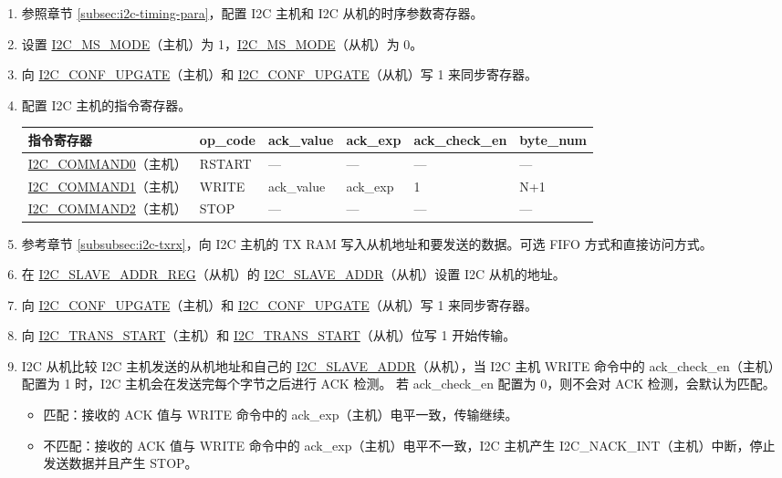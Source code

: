 \documentclass[main\_\_CN.tex]{subfiles}
\begin{document}
\begin{enumerate}
\item 参照章节 \ref{subsec:i2c-timing-para}，配置 I2C 主机和 I2C 从机的时序参数寄存器。
\item 设置 \hyperref[fielddesc:I2CMSMODE]{I2C\_MS\_MODE}（主机）为 1，\hyperref[fielddesc:I2CMSMODE]{I2C\_MS\_MODE}（从机）为 0。
\item 向 \hyperref[fielddesc:I2CCONFUPGATE]{I2C\_CONF\_UPGATE}（主机）和 \hyperref[fielddesc:I2CCONFUPGATE]{I2C\_CONF\_UPGATE}（从机）写 1 来同步寄存器。
\item 配置 I2C 主机的指令寄存器。

\begin{longtable}{ | p{4cm} | p{2cm} | p{2cm} | p{2cm} |p{2cm} | p{2cm} |}
\hline\rowcolor{lightgray}
指令寄存器& op\_code & ack\_value&ack\_exp&ack\_check\_en&byte\_num  \\ \hline
\hyperref[fielddesc:I2CCOMMAND0]{I2C\_COMMAND0}（主机）& RSTART& ---&---&---&---  \\ \hline
\hyperref[fielddesc:I2CCOMMAND1]{I2C\_COMMAND1}（主机）& WRITE& ack\_value&ack\_exp&1&N+1  \\ \hline
\hyperref[fielddesc:I2CCOMMAND2]{I2C\_COMMAND2}（主机）& STOP& ---&---&---&---  \\ \hline
\end{longtable}

\item 参考章节 \ref{subsubsec:i2c-txrx}，向 I2C 主机的 TX RAM 写入从机地址和要发送的数据。可选 FIFO 方式和直接访问方式。
\item 在 \hyperref[regdesc:I2CSLAVEADDRREG]{I2C\_SLAVE\_ADDR\_REG}（从机）的 \hyperref[fielddesc:I2CSLAVEADDR]{I2C\_SLAVE\_ADDR}（从机）设置 I2C 从机的地址。
\item 向 \hyperref[fielddesc:I2CCONFUPGATE]{I2C\_CONF\_UPGATE}（主机）和 \hyperref[fielddesc:I2CCONFUPGATE]{I2C\_CONF\_UPGATE}（从机）写 1 来同步寄存器。
\item 向 \hyperref[fielddesc:I2CTRANSSTART]{I2C\_TRANS\_START}（主机）和 \hyperref[fielddesc:I2CTRANSSTART]{I2C\_TRANS\_START}（从机）位写 1 开始传输。
\item I2C 从机比较 I2C 主机发送的从机地址和自己的 \hyperref[fielddesc:I2CSLAVEADDR]{I2C\_SLAVE\_ADDR}（从机），当 I2C 主机 WRITE 命令中的 ack\_check\_en（主机）配置为 1 时，I2C 主机会在发送完每个字节之后进行 ACK 检测。 若 ack\_check\_en 配置为 0，则不会对 ACK 检测，会默认为匹配。

\begin{itemize}
\item 匹配：接收的 ACK 值与 WRITE 命令中的 ack\_exp（主机）电平一致，传输继续。
\item 不匹配：接收的 ACK 值与 WRITE 命令中的 ack\_exp（主机）电平不一致，I2C 主机产生 I2C\_NACK\_INT（主机）中断，停止发送数据并且产生 STOP。
\end{itemize}


\end{enumerate}
\end{document}
